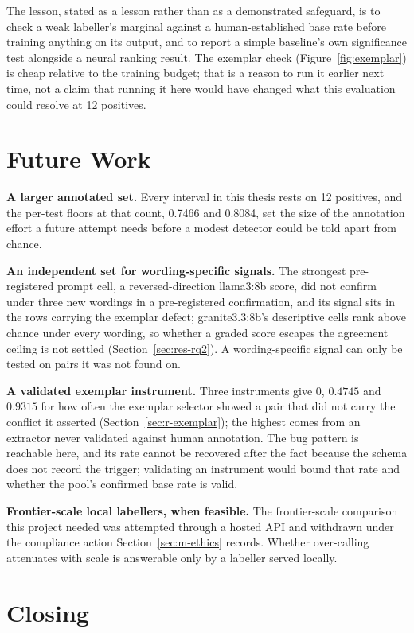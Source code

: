 The lesson, stated as a lesson rather than as a demonstrated safeguard, is to
check a weak labeller's marginal against a human-established base rate before
training anything on its output, and to report a simple baseline's own
significance test alongside a neural ranking result. The exemplar check
(Figure~\ref{fig:exemplar}) is cheap relative to the training budget; that
is a reason to run it earlier next time, not a claim that running it here
would have changed what this evaluation could resolve at 12 positives.

\section{Future Work}
\label{sec:conc-future}

\textbf{A larger annotated set.} Every interval in this thesis rests on 12
positives, and the per-test floors at that count, 0.7466 and 0.8084, set the
size of the annotation effort a future attempt needs before a modest
detector could be told apart from chance.

\textbf{An independent set for wording-specific signals.} The strongest
pre-registered prompt cell, a reversed-direction llama3:8b score, did not
confirm under three new wordings in a pre-registered confirmation, and its
signal sits in the rows carrying the exemplar defect; granite3.3:8b's descriptive cells
rank above chance under every wording, so whether a graded score escapes the
agreement ceiling is not settled (Section~\ref{sec:res-rq2}). A
wording-specific signal can only be tested on pairs it was not found on.

\textbf{A validated exemplar instrument.} Three instruments give $0$,
$0.4745$ and $0.9315$ for how often the exemplar selector showed a pair that
did not carry the conflict it asserted (Section~\ref{sec:r-exemplar}); the
highest comes from an extractor never validated against human annotation.
The bug pattern is reachable here, and its rate cannot be recovered after the
fact because the schema does not record the trigger; validating an instrument
would bound that rate and whether the pool's confirmed base rate is valid.

\textbf{Frontier-scale local labellers, when feasible.} The frontier-scale
comparison this project needed was attempted through a hosted API and
withdrawn under the compliance action Section~\ref{sec:m-ethics} records.
Whether over-calling attenuates with scale is answerable only by a labeller
served locally.

\section{Closing}
\label{sec:conc-closing}


